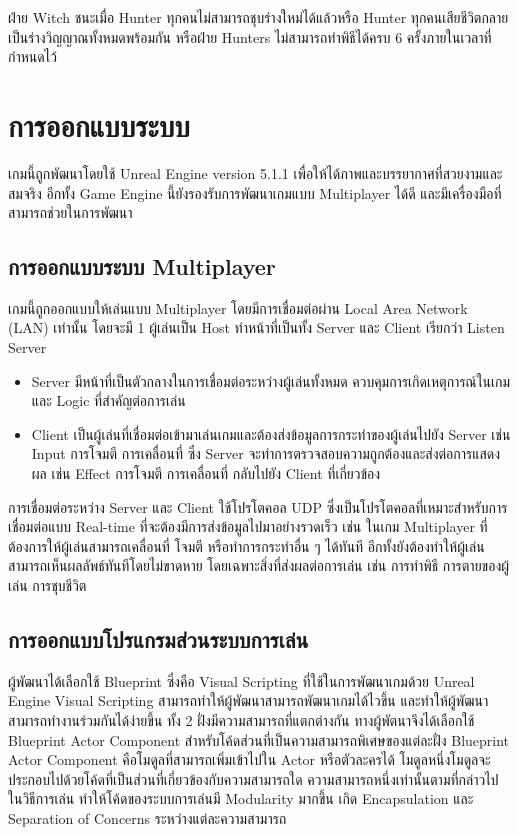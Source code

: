 ฝ่าย Witch ชนะเมื่อ Hunter ทุกคนไม่สามารถชุบร่างใหม่ได้แล้วหรือ Hunter ทุกคนเสียชีวิตกลายเป็นร่างวิญญาณทั้งหมดพร้อมกัน 
หรือฝ่าย Hunters ไม่สามารถทำพิธีได้ครบ 6 ครั้งภายในเวลาที่กำหนดไว้

\pagebreak

\section{การออกแบบระบบ}

เกมนี้ถูกพัฒนาโดยใช้ Unreal Engine version 5.1.1 เพื่อให้ได้ภาพและบรรยากาศที่สวยงามและสมจริง
อีกทั้ง Game Engine นี้ยังรองรับการพัฒนาเกมแบบ Multiplayer ได้ดี และมีเครื่องมือที่สามารถช่วยในการพัฒนา

\subsection{การออกแบบระบบ Multiplayer}

เกมนี้ถูกออกแบบให้เล่นแบบ Multiplayer โดยมีการเชื่อมต่อผ่าน Local Area Network (LAN) เท่านั้น
โดยจะมี 1 ผู้เล่นเป็น Host ทำหน้าที่เป็นทั้ง Server และ Client เรียกว่า Listen Server
\begin{itemize}
  \item Server มีหน้าที่เป็นตัวกลางในการเชื่อมต่อระหว่างผู้เล่นทั้งหมด ควบคุมการเกิดเหตุการณ์ในเกมและ Logic ที่สำคัญต่อการเล่น
  \item Client เป็นผู้เล่นที่เชื่อมต่อเข้ามาเล่นเกมและต้องส่งข้อมูลการกระทำของผู้เล่นไปยัง Server เช่น Input การโจมตี การเคลื่อนที่ 
  ซึ่ง Server จะทำการตรวจสอบความถูกต้องและส่งต่อการแสดงผล เช่น Effect การโจมตี การเคลื่อนที่ กลับไปยัง Client ที่เกี่ยวข้อง
\end{itemize}

การเชื่อมต่อระหว่าง Server และ Client ใช้โปรโตคอล UDP ซึ่งเป็นโปรโตคอลที่เหมาะสำหรับการเชื่อมต่อแบบ Real-time ที่จะต้องมีการส่งข้อมูลไปมาอย่างรวดเร็ว
เช่น ในเกม Multiplayer ที่ต้องการให้ผู้เล่นสามารถเคลื่อนที่ โจมตี หรือทำการกระทำอื่น ๆ ได้ทันที อีกทั้งยังต้องทำให้ผู้เล่นสามารถเห็นผลลัพธ์ทันทีโดยไม่ขาดหาย
โดยเฉพาะสิ่งที่ส่งผลต่อการเล่น เช่น การทำพิธี การตายของผู้เล่น การชุบชีวิต

\subsection{การออกแบบโปรแกรมส่วนระบบการเล่น}

ผู้พัฒนาได้เลือกใช้ Blueprint ซึ่งคือ Visual Scripting ที่ใช้ในการพัฒนาเกมด้วย Unreal Engine 
Visual Scripting สามารถทำให้ผู้พัฒนาสามารถพัฒนาเกมได้ไวขึ้น และทำให้ผู้พัฒนาสามารถทำงานร่วมกันได้ง่ายขึ้น
ทั้ง 2 ฝั่งมีความสามารถที่แตกต่างกัน ทางผู้พัตนาจึงได้เลือกใช้ Blueprint Actor Component สำหรับโค้ดส่วนที่เป็นความสามารถพิเศษของแต่ละฝั่ง
Blueprint Actor Component คือโมดูลที่สามารถเพิ่มเข้าไปใน Actor หรือตัวละครได้ โมดูลหนึ่งโมดูลจะประกอบไปด้วยโค้ดที่เป็นส่วนที่เกี่ยวข้องกับความสามารถใด 
ความสามารถหนึ่งเท่านั้นตามที่กล่าวไปในวิธีการเล่น ทำให้โค้ดของระบบการเล่นมี Modularity มากขึ้น เกิด Encapsulation และ Separation of Concerns ระหว่างแต่ละความสามารถ

